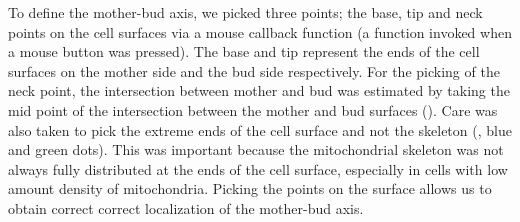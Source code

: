 To define the mother-bud axis, we picked three points; the base, tip and neck points on the cell surfaces via a mouse callback function (a function invoked when a mouse button was pressed). The base and tip represent the ends of the cell surfaces on the mother side and the bud side respectively. For the picking of the neck point, the intersection between mother and bud was estimated by taking the mid point of the intersection between the mother and bud surfaces (). Care was also taken to pick the extreme ends of the cell surface and not the skeleton (, blue and green dots). This was important because the mitochondrial skeleton was not always fully distributed at the ends of the cell surface, especially in cells with low amount density of mitochondria. Picking the points on the surface allows us to obtain correct correct localization of the mother-bud axis.
%

